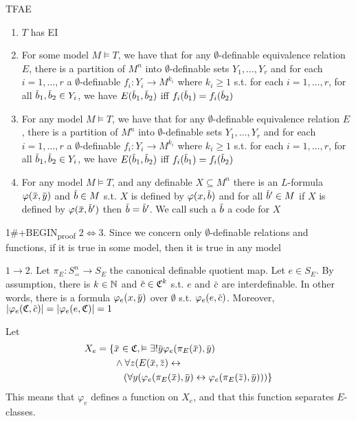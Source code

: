 \documentclass[11pt]{article}
\begin{document}
\begin{proposition}[]
TFAE
\begin{enumerate}
\item \(T\) has EI
\item For some model \(M\vDash T\), we have that for any \(\emptyset\)-definable equivalence relation \(E\),
there is a partition of \(M^n\) into \(\emptyset\)-definable sets \(Y_1,\dots,Y_r\) and for each \(i=1,\dots,r\)
a \(\emptyset\)-definable \(f_i:Y_i\to M^{k_i}\) where \(k_i\ge 1\) s.t. for each \(i=1,\dots,r\), for
all \(\barb_1,\barb_2\in Y_i\), we have \(E(\barb_1,\barb_2)\) iff \(f_i(\barb_1)=f_i(\barb_2)\)
\item For any model \(M\vDash T\), we have that for any \(\emptyset\)-definable equivalence relation \(E\),
there is a partition of \(M^n\) into \(\emptyset\)-definable sets \(Y_1,\dots,Y_r\) and for each \(i=1,\dots,r\)
a \(\emptyset\)-definable \(f_i:Y_i\to M^{k_i}\) where \(k_i\ge 1\) s.t. for each \(i=1,\dots,r\), for
all \(\barb_1,\barb_2\in Y_i\), we have \(E(\barb_1,\barb_2)\) iff \(f_i(\barb_1)=f_i(\barb_2)\)
\item For any model \(M\vDash T\), and any definable \(X\subseteq M^n\) there is
an \(L\)-formula \(\varphi(\barx,\bary)\) and \(\barb\in M\) s.t. \(X\) is defined by \(\varphi(x,\barb)\)
and for all \(\barb'\in M\) if \(X\) is defined by \(\varphi(\barx,\barb')\) then \(\barb=\barb'\).
We call such a \(\barb\) a code for \(X\)
\end{enumerate}
\end{proposition}

1\#+BEGIN\textsubscript{proof}
\(2\Leftrightarrow 3\). Since we concern only \(\emptyset\)-definable relations and functions, if it is true in some
model, then it is true in any model

\(1\to 2\). Let \(\pi_E:S_=^n\to S_E\) the canonical definable quotient map. Let \(e\in S_E\). By
assumption, there is \(k\in\mathbb{N}\) and \(\barc\in\fC^k\) s.t. \(e\) and \(\barc\) are interdefinable. In
other words, there is a formula \(\varphi_e(x,\bary)\) over \(\emptyset\) s.t. \(\varphi_e(e,\barc)\).
Moreover, \(\abs{\varphi_e(\fC,\barc)}=\abs{\varphi_e(e,\fC)}=1\)

Let
\begin{align*}
X_e=\{&\barx\in\fC,\vDash\exists!\bary\varphi_e(\pi_E(\barx),\bary)\\&\wedge\forall z(E(\barx,\barz)\leftrightarrow\\&\quad(\forall y(\varphi_e(\pi_E(\barx),\bary)\leftrightarrow\varphi_e(\pi_E(\barz),\bary)))\}
\end{align*}
This means that \(\varphi_e\) defines a function on \(X_e\), and that this function
separates \(E\)-classes.
\end{document}
